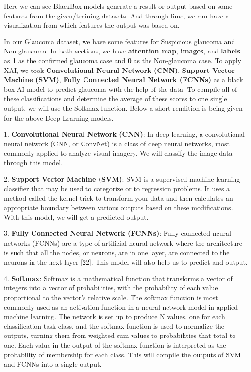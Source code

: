 \vspace{5mm}
Here we can see BlackBox models generate a result or output based on some features from the given/training datasets. And through lime, we can have a visualization from which features the output was based on.

\vspace{5mm}
In our Glaucoma dataset, we have some features for Suspicious glaucoma and Non-glaucoma. In both sections, we have \textbf{attention map}, \textbf{images}, and \textbf{labels} as \textbf{1} as the confirmed glaucoma case and \textbf{0} as the Non-glaucoma case. To apply XAI, we took \textbf{Convolutional Neural Network (CNN)}, \textbf{Support Vector Machine (SVM)}, \textbf{Fully Connected Neural Network (FCNNs)} as a black box AI model to predict glaucoma with the help of the data. To compile all of these classifications and determine the average of these scores to one single output, we will use the Softmax function. Below a short rendition is being given for the above Deep Learning models.

\vspace{5mm}
1.    \textbf{Convolutional Neural Network (CNN)}: In deep learning, a convolutional neural network (CNN, or ConvNet) is a class of deep neural networks, most commonly applied to analyze visual imagery. We will classify the image data through this model.

\vspace{5mm}
2.    \textbf{Support Vector Machine (SVM)}: SVM is a supervised machine learning classifier that may be used to categorize or to regression problems.
It uses a method called the kernel trick to transform your data and then calculates an appropriate boundary between various outputs based on these modifications. With this model, we will get a predicted output.

\vspace{5mm}
3.    \textbf{Fully Connected Neural Network (FCNNs)}: Fully connected neural networks (FCNNs) are a type of artificial neural network where the architecture is such that all the nodes, or neurons, are in one layer, are connected to the neurons in the next layer [22]. This model will also help us to predict and output.

\vspace{5mm}
4.    \textbf{Softmax}: Softmax is a mathematical function that transforms a vector of integers into a vector of probabilities, with the probability of each value proportional to the vector's relative scale. The softmax function is most commonly used as an activation function in a neural network model in applied machine learning. The network is set up to produce N values, one for each classification task class, and the softmax function is used to normalize the outputs, turning them from weighted sum values to probabilities that total to one. Each value in the output of the softmax function is interpreted as the probability of membership for each class. This will compile the outputs of SVM and FCNNs into a single output.

